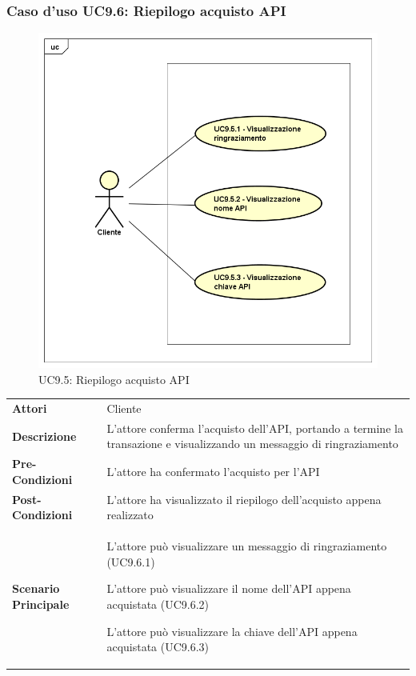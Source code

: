 \subsubsection{Caso d'uso UC9.6: Riepilogo acquisto API}
\label{UC9_6}
\begin{figure}[ht]
	\centering
	\includegraphics[scale=0.45]{UML/UC9_6.png}
	\caption{UC9.5: Riepilogo acquisto API}
\end{figure}

\begin{minipage}{\linewidth}
	\begin{tabular}{ l | p{11cm}}
		\hline
		\rowcolor{Gray}
		\multicolumn{2}{c}{UC9.5 - Riepilogo acquisto API} \\
		\hline
		\textbf{Attori} & Cliente \\
		\textbf{Descrizione} & L'attore conferma l'acquisto dell'API, portando a termine la transazione e visualizzando un messaggio di ringraziamento \\
		\textbf{Pre-Condizioni} & L'attore ha confermato l'acquisto per l'API \\
		\textbf{Post-Condizioni} & L'attore ha visualizzato il riepilogo dell'acquisto appena realizzato \\
		\textbf{Scenario Principale} & 
		\begin{enumerate*}[label=(\arabic*.),itemjoin={\newline}]
			\item L'attore può visualizzare un messaggio di ringraziamento (UC9.6.1)
			\item L'attore può visualizzare il nome dell'API appena acquistata (UC9.6.2)
			\item L'attore può visualizzare la chiave dell'API appena acquistata (UC9.6.3)
		\end{enumerate*}\\
	\end{tabular}
\end{minipage}

